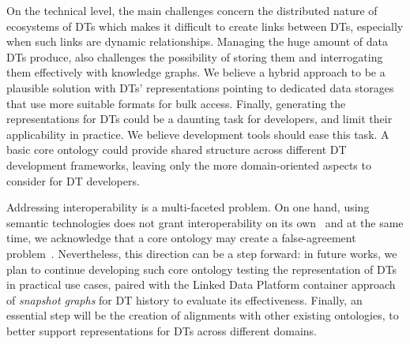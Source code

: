 On the technical level, the main challenges concern the distributed nature of ecosystems of DTs which makes it difficult to create links between DTs, especially when such links are dynamic relationships.  
%
Managing the huge amount of data DTs produce, also challenges the possibility of storing them and interrogating them effectively with knowledge graphs.
%
We believe a hybrid approach to be a plausible solution with DTs' representations pointing to dedicated data storages that use more suitable formats for bulk access.
%
Finally, generating the representations for DTs could be a daunting task for developers, and limit their applicability in practice.
%
We believe development tools should ease this task. A basic core ontology could provide shared structure across different DT development frameworks, leaving only the more domain-oriented aspects to consider for DT developers.

Addressing interoperability is a multi-faceted problem. On one hand, using semantic technologies does not grant interoperability on its own~\cite{guizzardi2020dint} and at the same time, we acknowledge that a core ontology may create a false-agreement problem~\cite{guarino1998formal}. 
%
Nevertheless, this direction can be a step forward:
in future works, we plan to continue developing such core ontology testing the representation of DTs in practical use cases, paired with the Linked Data Platform container approach of \textit{snapshot graphs} for DT history to evaluate its effectiveness.
%
Finally, an essential step will be the creation of alignments with other existing ontologies, to better support representations for DTs across different domains.

